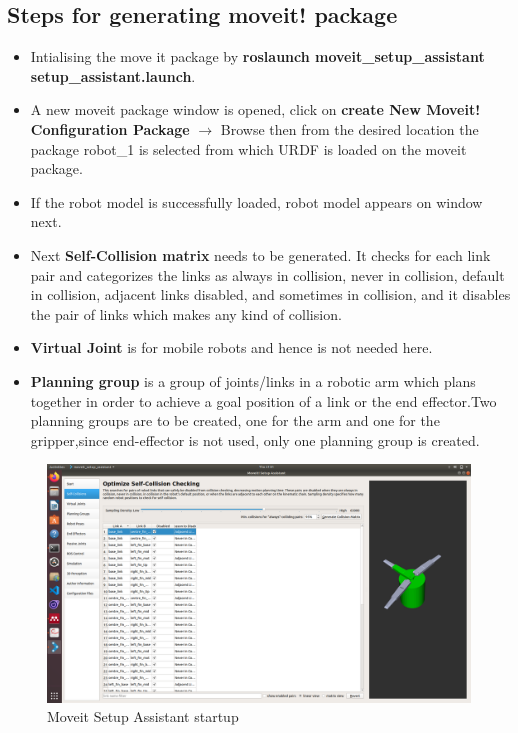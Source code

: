 \documentclass[a4paper,12pt,one side]{report}%
\begin{document}
    \subsection{Steps for generating moveit! package}
   \begin{itemize}
    \item Intialising the move it package by \textbf{roslaunch moveit\_setup\_assistant setup\_assistant.launch}.
    \item A new moveit package window is opened, click on \textbf{create New Moveit! Configuration Package }$\rightarrow$ Browse then from the desired location the package robot\_1 is selected from which URDF is loaded on the  moveit package. 
    \item If the robot model is successfully loaded, robot model appears on  window next.
\item  Next\textbf{ Self-Collision matrix} needs to be generated. It checks for each link pair and categorizes the links as always in collision, never in collision, default in collision, adjacent links disabled, and sometimes in collision, and it disables the pair of links which makes any kind of collision.
\item \textbf{Virtual Joint} is for mobile robots and hence is not needed here.
\item  \textbf{Planning group} is a group of joints/links in a robotic arm  which plans together in order to achieve a goal position of a link or the end effector.Two planning groups are to be created, one for the arm and one for the gripper,since end-effector is not used, only one planning group is created.
\end{itemize}
\begin{figure}
    \centering
    \includegraphics[scale=0.2]{gripper_images/setup_asst_startup.png}
    \caption{Moveit Setup Assistant startup}
    \label{fig:my_label}
\end{figure}
\end{document}
